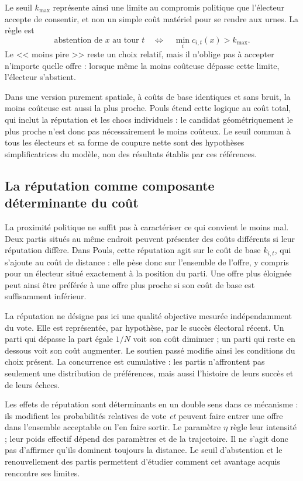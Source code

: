 \documentclass[11pt,a4paper]{article}
\begin{document}
Le seuil $k_{\max}$ représente ainsi une limite au compromis politique
que l'électeur accepte de consentir, et non un simple coût matériel
pour se rendre aux urnes. La règle est
\[
\text{abstention de }x\text{ au tour }t
\quad\Longleftrightarrow\quad
\min_i c_{i,t}(x)>k_{\max}.
\]
Le << moins pire >> reste un choix relatif, mais il n'oblige pas à
accepter n'importe quelle offre : lorsque même la moins coûteuse
dépasse cette limite, l'électeur s'abstient.

Dans une version purement spatiale, à coûts de base identiques et sans
bruit, la moins coûteuse est aussi la plus proche. Pouls étend cette
logique au coût total, qui inclut la réputation et les chocs
individuels : le candidat géométriquement le plus proche n'est donc
pas nécessairement le moins coûteux. Le seuil commun à tous les
électeurs et sa forme de coupure nette sont des hypothèses
simplificatrices du modèle, non des résultats établis par ces
références.

\subsection{La réputation comme composante déterminante du coût}
La proximité politique ne suffit pas à caractériser ce qui convient
le moins mal. Deux partis situés au même endroit peuvent présenter
des coûts différents si leur réputation diffère. Dans Pouls, cette
réputation agit sur le coût de base $k_{i,t}$, qui s'ajoute au coût
de distance : elle pèse donc sur l'ensemble de l'offre, y compris
pour un électeur situé exactement à la position du parti.
Une offre plus éloignée peut ainsi être préférée à une offre plus
proche si son coût de base est suffisamment inférieur.

La réputation ne désigne pas ici une qualité objective mesurée
indépendamment du vote. Elle est représentée, par hypothèse, par le
succès électoral récent. Un parti qui dépasse la part égale $1/N$
voit son coût diminuer ; un parti qui reste en dessous voit son coût
augmenter. Le soutien passé modifie ainsi les conditions du choix
présent. La concurrence est cumulative : les partis n'affrontent pas
seulement une distribution de préférences, mais aussi l'histoire de
leurs succès et de leurs échecs.

Les effets de réputation sont déterminants en un double sens dans
ce mécanisme : ils modifient les probabilités relatives de vote
\emph{et} peuvent faire entrer une offre dans l'ensemble acceptable
ou l'en faire sortir. Le paramètre $\eta$ règle leur intensité ;
leur poids effectif dépend des paramètres et de la trajectoire.
Il ne s'agit donc pas d'affirmer qu'ils dominent toujours la distance.
Le seuil d'abstention et le renouvellement des partis permettent
d'étudier comment cet avantage acquis rencontre ses limites.
\end{document}
